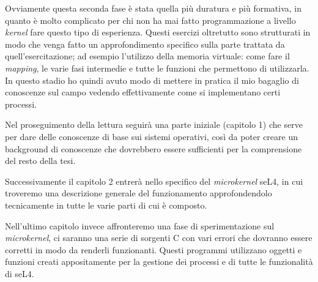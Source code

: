 Ovviamente questa seconda fase è stata quella più duratura e più formativa, in quanto è molto complicato per chi non ha mai fatto programmazione a livello \textit{kernel} fare questo tipo di esperienza. Questi esercizi oltretutto sono strutturati in modo che venga fatto un approfondimento specifico sulla parte trattata da quell'esercitazione; ad esempio l'utilizzo della memoria virtuale: come fare il \textit{mapping}, le varie fasi intermedie e tutte le funzioni che permettono di utilizzarla. In questo stadio ho quindi avuto modo di mettere in pratica il mio bagaglio di conoscenze sul campo vedendo effettivamente come si implementano certi processi.
\newline

Nel proseguimento della lettura seguirà una parte iniziale (capitolo 1) che serve per dare delle conoscenze di base sui sistemi operativi, così da poter creare un background di conoscenze che dovrebbero essere sufficienti per la comprensione del resto della tesi. 

Successivamente il capitolo 2 entrerà nello specifico del \textit{microkernel} seL4, in cui troveremo una descrizione generale del funzionamento approfondendolo tecnicamente in tutte le varie parti di cui è composto.

Nell'ultimo capitolo invece affronteremo una fase di sperimentazione sul \textit{microkernel}, ci saranno una serie di sorgenti C con vari errori che dovranno essere corretti in modo da renderli funzionanti. Questi programmi utilizzano oggetti e funzioni creati appositamente per la gestione dei processi e di tutte le funzionalità di seL4. 
